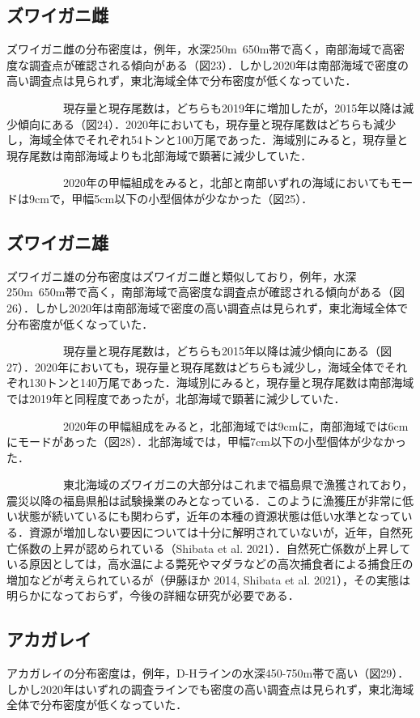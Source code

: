 \documentclass[11pt]{article} %
\begin{document}
\begin{linenumbers}
\subsection{ズワイガニ雌}
ズワイガニ雌の分布密度は，例年，水深250m~650m帯で高く，南部海域で高密度な調査点が確認される傾向がある（図23）．しかし2020年は南部海域で密度の高い調査点は見られず，東北海域全体で分布密度が低くなっていた．

\ \ \ \ \ \ \ \ \ \ 
現存量と現存尾数は，どちらも2019年に増加したが，2015年以降は減少傾向にある（図24）．2020年においても，現存量と現存尾数はどちらも減少し，海域全体でそれぞれ54トンと100万尾であった．海域別にみると，現存量と現存尾数は南部海域よりも北部海域で顕著に減少していた．

\ \ \ \ \ \ \ \ \ \ 
2020年の甲幅組成をみると，北部と南部いずれの海域においてもモードは9cmで，甲幅5cm以下の小型個体が少なかった（図25）．


\subsection{ズワイガニ雄}
ズワイガニ雄の分布密度はズワイガニ雌と類似しており，例年，水深250m~650m帯で高く，南部海域で高密度な調査点が確認される傾向がある（図26）．しかし2020年は南部海域で密度の高い調査点は見られず，東北海域全体で分布密度が低くなっていた．

\ \ \ \ \ \ \ \ \ \ 
現存量と現存尾数は，どちらも2015年以降は減少傾向にある（図27）．2020年においても，現存量と現存尾数はどちらも減少し，海域全体でそれぞれ130トンと140万尾であった．海域別にみると，現存量と現存尾数は南部海域では2019年と同程度であったが，北部海域で顕著に減少していた．

\ \ \ \ \ \ \ \ \ \ 
2020年の甲幅組成をみると，北部海域では9cmに，南部海域では6cmにモードがあった（図28）．北部海域では，甲幅7cm以下の小型個体が少なかった．

\ \ \ \ \ \ \ \ \ \ 
東北海域のズワイガニの大部分はこれまで福島県で漁獲されており，震災以降の福島県船は試験操業のみとなっている．このように漁獲圧が非常に低い状態が続いているにも関わらず，近年の本種の資源状態は低い水準となっている．資源が増加しない要因については十分に解明されていないが，近年，自然死亡係数の上昇が認められている（Shibata et al. 2021）．自然死亡係数が上昇している原因としては，高水温による斃死やマダラなどの高次捕食者による捕食圧の増加などが考えられているが（伊藤ほか 2014, Shibata et al. 2021），その実態は明らかになっておらず，今後の詳細な研究が必要である．


\subsection{アカガレイ}
アカガレイの分布密度は，例年，D-Hラインの水深450-750m帯で高い（図29）．しかし2020年はいずれの調査ラインでも密度の高い調査点は見られず，東北海域全体で分布密度が低くなっていた．


\end{linenumbers}
\end{document}

